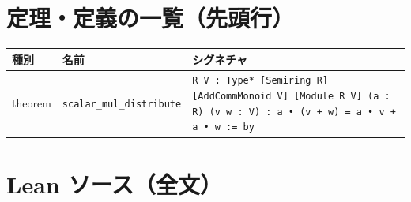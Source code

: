 \documentclass[12pt]{article}
\theoremstyle{definition}
\begin{document}
\section*{定理・定義の一覧（先頭行）}
\begin{center}
\begin{tabular}{lll}
\textbf{種別} & \textbf{名前} & \textbf{シグネチャ} \\ \hline
theorem & \texttt{scalar\_mul\_distribute} & \texttt{{R V : Type*} [Semiring R] [AddCommMonoid V] [Module R V] (a : R) (v w : V) : a • (v + w) = a • v + a • w := by} \\
\end{tabular}
\end{center}

\section*{Lean ソース（全文）}
\end{document}
